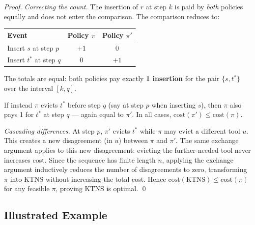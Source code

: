 \documentclass[11pt,a4paper]{article}
\theoremstyle{plain}
\theoremstyle{definition}
\begin{document}
\begin{proofbox}
\begin{proof}
\medskip
\noindent\textit{Correcting the count.}
The insertion of $r$ at step $k$ is paid by \emph{both} policies equally and does
not enter the comparison. The comparison reduces to:
\begin{center}
\begin{tabular}{lcc}
  \toprule
  Event & Policy $\pi$ & Policy $\pi'$ \\
  \midrule
  Insert $s$ at step $p$ & $+1$ & $0$ \\
  Insert $t^*$ at step $q$ & $0$ & $+1$ \\
  \bottomrule
\end{tabular}
\end{center}
The totals are equal: both policies pay exactly \textbf{1 insertion} for
the pair $\{s, t^*\}$ over the interval $[k,q]$.

If instead $\pi$ evicts $t^*$ before step $q$ (say at step $p$ when inserting $s$),
then $\pi$ also pays 1 for $t^*$ at step $q$ — again equal to $\pi'$.
In all cases, $\mathrm{cost}(\pi') \le \mathrm{cost}(\pi)$.

\medskip
\noindent\textit{Cascading differences.}
At step $p$, $\pi'$ evicts $t^*$ while $\pi$ may evict a different tool $u$.
This creates a new disagreement (in $u$) between $\pi$ and $\pi'$.
The same exchange argument applies to this new disagreement: evicting the
further-needed tool never increases cost.
Since the sequence has finite length $n$, applying the exchange argument
inductively reduces the number of disagreements to zero, transforming $\pi$ into
KTNS without increasing the total cost.
Hence $\mathrm{cost}(\text{KTNS}) \le \mathrm{cost}(\pi)$ for any feasible $\pi$,
proving KTNS is optimal. \qed
\end{proof}
\end{proofbox}

\subsection{Illustrated Example}
\end{document}
